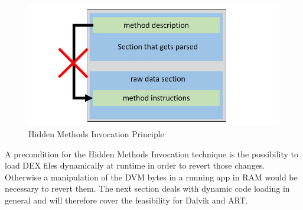 \begin{figure}[htb]
  \centering
  \includegraphics[scale=0.5]{figures/hidden_method_invocation}
  \caption[Hidden Methods Invocation]{Hidden Methods Invocation Principle}
  \label{fig:hidden_method_invocation}
\end{figure}

A precondition for the Hidden Methods Invocation technique is the
possibility to load DEX files dynamically at runtime in order to revert
those changes. Otherwise a manipulation of the DVM bytes in a running app in RAM would be necessary to revert them. The next section deals with dynamic
code loading in general and will therefore cover the feasibility for Dalvik
and ART.

